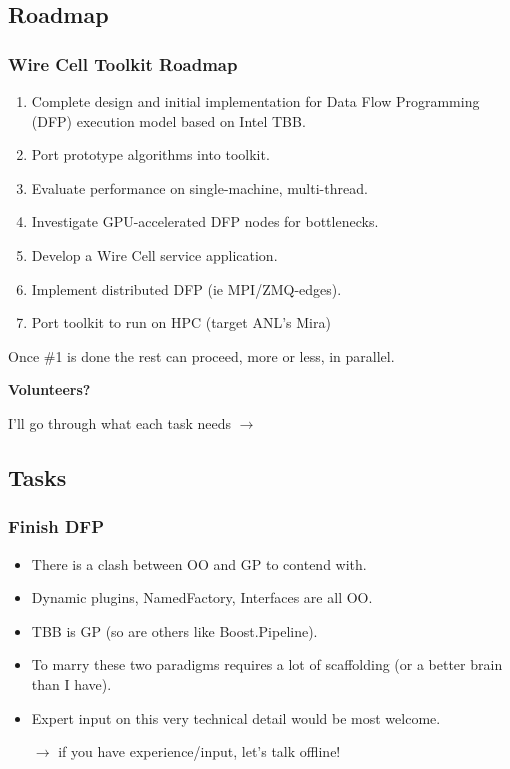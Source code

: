 \documentclass[xcolor=dvipsnames]{beamer}
\begin{document}
\begin{frame}
\end{frame}

\subsection{Roadmap}
\begin{frame}
  \frametitle{Wire Cell Toolkit Roadmap}

  \begin{enumerate}\small
  \item Complete design and initial implementation for Data Flow
    Programming (DFP) execution model based on Intel TBB.
  \item Port prototype algorithms into toolkit.
  \item Evaluate performance on single-machine, multi-thread.
  \item Investigate GPU-accelerated DFP nodes for bottlenecks.
  \item Develop a Wire Cell service application.
  \item Implement distributed DFP (ie MPI/ZMQ-edges).
  \item Port toolkit to run on HPC (target ANL's Mira)
  \end{enumerate}

  Once \#1 is done the rest can proceed, more or less, in parallel.

  \vfill

  \textbf{Volunteers?}

  \vfill

  I'll go through what each task needs $\longrightarrow$

\end{frame}

\subsection{Tasks}

\begin{frame}
  \frametitle{Finish DFP}
  \begin{itemize}
  \item There is a clash between OO and GP to contend with.
  \item Dynamic plugins, NamedFactory, Interfaces are all OO.
  \item TBB is GP (so are others like Boost.Pipeline).
  \item To marry these two paradigms requires a lot of scaffolding (or a better brain than I have).
  \item Expert input on this very technical detail would be most welcome.
  \item[$\rightarrow$] if you have experience/input, let's talk offline!
  \end{itemize}
\end{frame}
\end{document}
